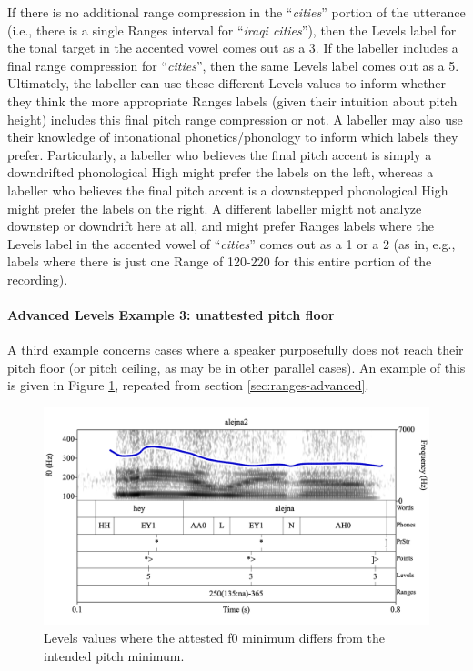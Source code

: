 \documentclass[11pt, twoside]{memoir}
\def\langtext#1{\textit{#1}}
\begin{document}
If there is no additional range compression in the “\langtext{cities}” portion of the utterance (i.e., there is a single Ranges interval for “\langtext{iraqi cities}”), then the Levels label for the tonal target in the accented vowel comes out as a 3. If the labeller includes a final range compression for “\langtext{cities}”, then the same Levels label comes out as a 5. Ultimately, the labeller can use these different Levels values to inform whether they think the more appropriate Ranges labels (given their intuition about pitch height) includes this final pitch range compression or not. A labeller may also use their knowledge of intonational phonetics\slash phonology to inform which labels they prefer. Particularly, a labeller who believes the final pitch accent is simply a downdrifted phonological High might prefer the labels on the left, whereas a labeller who believes the final pitch accent is a downstepped phonological High might prefer the labels on the right. A different labeller might not analyze downstep or downdrift here at all, and might prefer Ranges labels where the Levels label in the accented vowel of “\langtext{cities}” comes out as a 1 or a 2 (as in, e.g., labels where there is just one Range of 120-220 for this entire portion of the recording).

\paragraph{Advanced Levels Example 3: unattested pitch floor}
A third example concerns cases where a speaker purposefully does not reach their pitch floor (or pitch ceiling, as may be in other parallel cases). An example of this is given in Figure \ref{fig:alejna2 na Levels}, repeated from section \ref{sec:ranges-advanced}.

\begin{figure}[H]
\centering
%
\includegraphics[width=.875\linewidth]{Ranges-alejna2.png}
%
\caption{Levels values where the attested f0 minimum differs from the intended pitch minimum.%
\label{fig:alejna2 na Levels}%
}
\end{figure}
\end{document}
